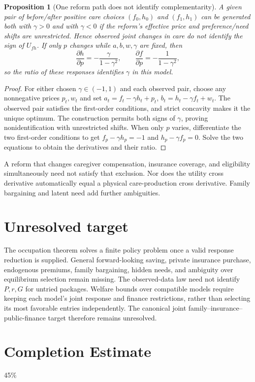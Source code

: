 \documentclass[11pt]{article}
\newtheorem{proposition}[theorem]{Proposition}
\theoremstyle{remark}
\begin{document}
\begin{proposition}[One reform path does not identify complementarity]
A given pair of before/after positive care choices $(f_0,h_0)$ and $(f_1,h_1)$ can be generated both with $\gamma>0$ and with $\gamma<0$ if the reform's effective price and preference/need shifts are unrestricted. Hence observed joint changes in care do not identify the sign of $U_{fh}$.
If only $p$ changes while $a,b,w,\gamma$ are fixed, then
\[
 \frac{\partial h}{\partial p}=-\frac{\gamma}{1-\gamma^2},
 \qquad \frac{\partial f}{\partial p}=-\frac1{1-\gamma^2},
\]
so the ratio of these responses identifies $\gamma$ in this model.
\end{proposition}
\begin{proof}
For either chosen $\gamma\in(-1,1)$ and each observed pair, choose any nonnegative prices $p_t,w_t$ and set
$a_t=f_t-\gamma h_t+p_t$, $b_t=h_t-\gamma f_t+w_t$.
The observed pair satisfies the first-order conditions, and strict concavity makes it the unique optimum. The construction permits both signs of $\gamma$, proving nonidentification with unrestricted shifts. When only $p$ varies, differentiate the two first-order conditions to get
$f_p-\gamma h_p=-1$ and $h_p-\gamma f_p=0$.
Solve the two equations to obtain the derivatives and their ratio.
\end{proof}

A reform that changes caregiver compensation, insurance coverage, and eligibility simultaneously need not satisfy that exclusion. Nor does the utility cross derivative automatically equal a physical care-production cross derivative. Family bargaining and latent need add further ambiguities.

\section{Unresolved target}
The occupation theorem solves a finite policy problem once a valid response reduction is supplied. General forward-looking saving, private insurance purchase, endogenous premiums, family bargaining, hidden needs, and ambiguity over equilibrium selection remain missing. The observed-data law need not identify $P,r,G$ for untried packages. Welfare bounds over compatible models require keeping each model's joint response and finance restrictions, rather than selecting its most favorable entries independently. The canonical joint family--insurance--public-finance target therefore remains unresolved.

\section{Completion Estimate}
45\%
\end{document}
